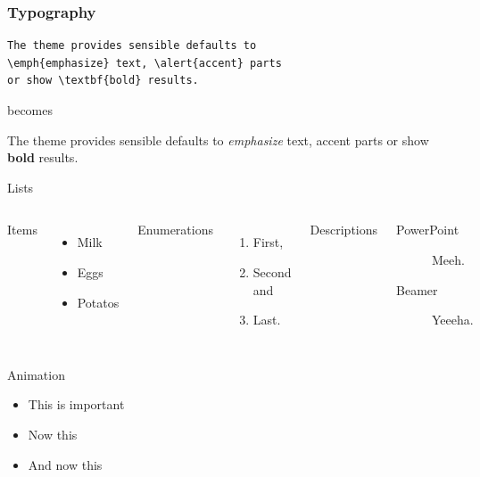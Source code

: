 \documentclass[10pt,pdf,utf8,russian,aspectratio=169]{beamer}
\begin{document}
\begin{frame}[fragile]
  \frametitle{Typography}
      \begin{verbatim}The theme provides sensible defaults to
\emph{emphasize} text, \alert{accent} parts
or show \textbf{bold} results.\end{verbatim}

  \begin{center}becomes\end{center}

  The theme provides sensible defaults to \emph{emphasize} text,
  \alert{accent} parts or show \textbf{bold} results.
\end{frame}
\begin{frame}{Lists}
  \begin{columns}[T,onlytextwidth]
      Items
      \begin{itemize}
        \item Milk \item Eggs \item Potatos
      \end{itemize}

      Enumerations
      \begin{enumerate}
        \item First, \item Second and \item Last.
      \end{enumerate}

      Descriptions
      \begin{description}
        \item[PowerPoint] Meeh. \item[Beamer] Yeeeha.
      \end{description}
  \end{columns}
\end{frame}
\begin{frame}{Animation}
  \begin{itemize}[<+- | alert@+>]
    \item \alert<4>{This is important}
    \item Now this
    \item And now this
  \end{itemize}
\end{frame}
\end{document}
